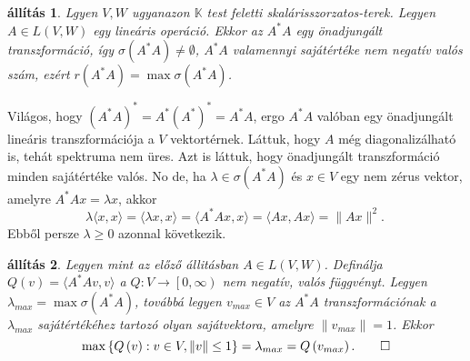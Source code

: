 \documentclass[9pt, a4paper, showtrims]{memoir}
\makeatletter
\renewenvironment{proof}[1][\proofname]
    {\par\pushQED{\qed}%
    \normalfont \topsep6\p@\@plus6\p@\relax
    \trivlist
    \item[\hskip\labelsep
        \itshape
    #1\@addpunct{:}]\ignorespaces}
    {\popQED\endtrivlist\@endpefalse}
\theoremstyle{plain}
\newtheorem{proposition}{állítás}[chapter]
\theoremstyle{remark}
\theoremstyle{definition}
\newcommand{\ip}[2]{\langle#1,#2\rangle}
\makeatother
\begin{document}
\begin{proposition}
	Lgyen $V,W$ ugyanazon $\mathbb{K}$ test feletti skalárisszorzatos-terek.
	Legyen $A\in L\left( V,W \right)$ egy lineáris operáció.
	Ekkor az $A^\ast A$ egy önadjungált transzformáció,
	így $\sigma\left( A^\ast A \right)\neq \emptyset$,
	$A^\ast A$ valamennyi sajátértéke nem negatív valós szám,
	ezért
	$r\left( A^\ast A \right)=\max\sigma\left( A^\ast A \right)$.
\end{proposition}
\begin{proof}
	Világos, hogy $(A^\ast A)^\ast=A^\ast (A^\ast)^\ast=A^\ast A$,
	ergo $A^\ast A$ valóban egy önadjungált lineáris transzformációja a $V$ vektortérnek.
	Láttuk, hogy $A$ még diagonalizálható is, tehát spektruma nem üres.
	Azt is láttuk, hogy önadjungált transzformáció minden sajátértéke valós.
	No de, ha $\lambda\in\sigma\left( A^\ast A \right)$ és $x\in V$ egy nem zérus vektor,
	amelyre $A^\ast Ax=\lambda x$, akkor
	\[
		\lambda\ip{x}{x}
		=
		\ip{\lambda x}{x}
		=
		\ip{A^\ast Ax}{x}
		=
		\ip{Ax}{Ax}
		=\|Ax\|^2.
		\
	\]
	Ebből persze $\lambda\geq 0$ azonnal következik.
\end{proof}
\begin{proposition}
	Legyen mint az előző állitásban $A\in L\left( V,W \right)$.
	Definálja $Q\left( v \right)=\ip{A^\ast Av}{v}$ a $Q:V\to\left[ 0,\infty \right)$ nem negatív, valós függvényt.
	Legyen $\lambda_{max}=\max\sigma\left( A^\ast A \right)$,
	továbbá legyen
	$v_{max}\in V$ az $A^\ast A$ transzformációnak a $\lambda_{max}$ sajátértékéhez tartozó olyan sajátvektora,
	amelyre $\|v_{max}\|=1$.
	Ekkor
	\[
		\max\left\{ Q\left( v \right):v\in V,\|v\|\leq 1 \right\}
		=
		\lambda_{max}
		=
		Q\left( v_{max} \right).
		\qedhere
	\]
\end{proposition}
\end{document}
